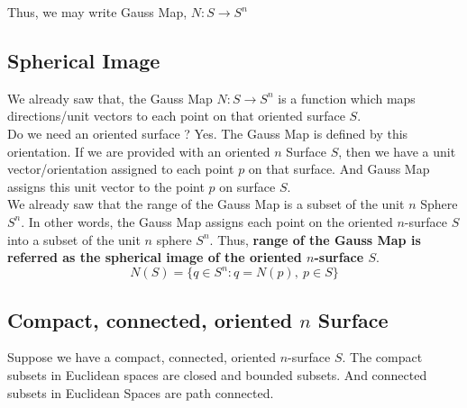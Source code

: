 	Thus, we may write Gauss Map, $N : S \to S^n$
\subsection{Spherical Image}
	We already saw that, the Gauss Map $N : S \to S^n$ is a function which maps directions/unit vectors to each point on that oriented surface $S$.\\

	Do we need an oriented surface ? Yes. The Gauss Map is defined by this orientation. If we are provided with an oriented $n$ Surface $S$, then we have a unit vector/orientation assigned to each point $p$ on that surface. And Gauss Map assigns this unit vector to the point $p$ on surface $S$.\\

	We already saw that the range of the Gauss Map is a subset of the unit $n$ Sphere $S^n$. In other words, the Gauss Map assigns each point on the oriented $n$-surface $S$ into a subset of the unit $n$ sphere $S^n$. Thus, \textbf{range of the Gauss Map is referred as the spherical image of the oriented $n$-surface $S$}.
	\begin{equation}
	N(S) = \{ q \in S^n : q = N(p),\ p \in S \}
	\end{equation}

\subsection{Compact, connected, oriented $n$ Surface}
	Suppose we have a compact, connected, oriented $n$-surface $S$. The compact subsets in Euclidean spaces are closed and bounded subsets. And connected subsets in Euclidean Spaces are path connected.\\

